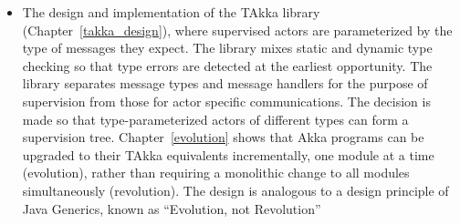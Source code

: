 \begin{itemize}
\begin{comment}
  \item A formal model that captures the essence of the supervision principle.  
  The model (Chapter~\ref{supervision_model}) exhibits key features of the 
  supervision principle used in existing libraries including Erlang, Akka, and 
  TAkka. It provides a tool to compare the design alternatives to the 
  supervision principle.  
\end{comment}  
  \item The design and implementation of the TAkka library (Chapter~\ref{takka_design}), where supervised 
actors are parameterized by the type of messages they expect.  The library 
  mixes static and dynamic type checking so that type
  errors are detected at the earliest opportunity.  The library separates 
  message types and message handlers for the purpose of supervision from those 
  for actor specific communications.  The decision is made so that   
  type-parameterized actors of different types can form a supervision tree. 
  Chapter~\ref{evolution} shows that Akka 
  programs can be upgraded to their TAkka equivalents incrementally, one module 
  at a time (evolution), rather 
  than requiring a monolithic change to all modules simultaneously (revolution).  The
  design is analogous to a design principle of Java Generics, known as ``Evolution,
  not Revolution''


\end{itemize}
